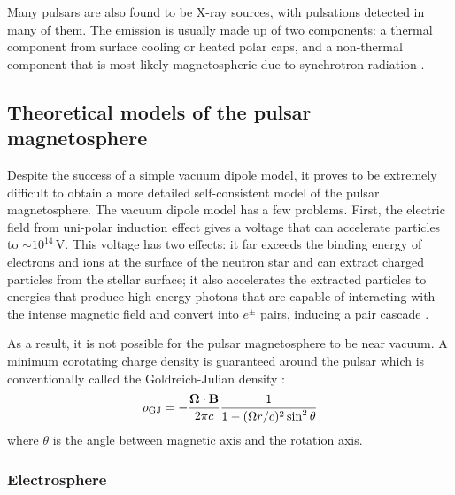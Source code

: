 Many pulsars are also found to be X-ray sources, with pulsations detected in
many of them. The emission is usually made up of two components: a thermal
component from surface cooling or heated polar caps, and a non-thermal component
that is most likely magnetospheric due to synchrotron radiation
\citep{kaspi_isolated_2006}.



\subsection{Theoretical models of the pulsar magnetosphere}
\label{sec:intro-pulsar-theory}

Despite the success of a simple vacuum dipole model, it proves to be extremely
difficult to obtain a more detailed self-consistent model of the pulsar
magnetosphere. The vacuum dipole model has a few problems. First, the
electric field from uni-polar induction effect gives a voltage that can
accelerate particles to $\sim 10^{14}\,\mathrm{V}$.
This voltage has two effects: it far exceeds the binding energy of electrons and
ions at the surface of the neutron star and can extract charged particles from
the stellar surface; it also accelerates the extracted particles to energies
that produce high-energy photons that are capable of interacting with the
intense magnetic field and convert into $e^{\pm}$ pairs, inducing a pair
cascade \citep{erber_high-energy_1966}.

As a result, it is not possible for the pulsar magnetosphere to be near vacuum.
A minimum corotating charge density is guaranteed around the pulsar which is
conventionally called the Goldreich-Julian density \citep{goldreich_pulsar_1969}:
\begin{equation}
  \label{eq:gj-density}
  \rho_\mathrm{GJ} = -\frac{\bm{\Omega}\cdot \mathbf{B}}{2\pi c}\frac{1}{1 - (\Omega r/c)^2\sin^{2}\theta}
\end{equation}
where $\theta$ is the angle between magnetic axis and the rotation axis.

\subsubsection{Electrosphere}
\label{sec:electrosphere}

